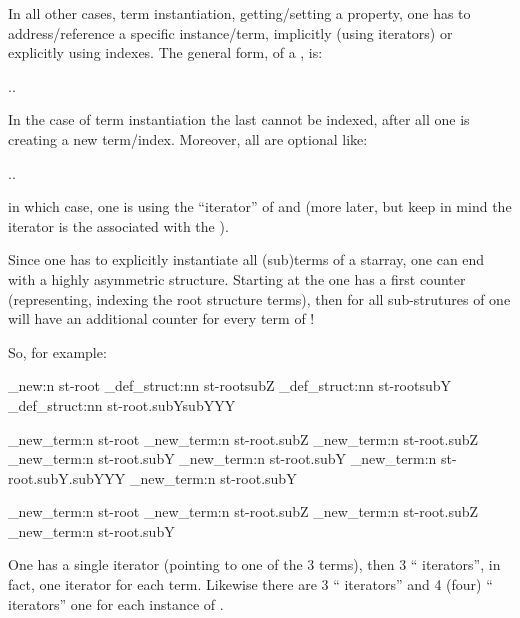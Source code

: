 \documentclass[10pt]{article}
\begin{document}
In all other cases, term instantiation, getting/setting a property, one has to address/reference a specific instance/term, implicitly (using iterators) or explicitly using indexes.
The general form, of a , is: \par
{}.. \par
In the case of term instantiation the last  cannot be indexed, after all one is creating a new term/index. Moreover, all  are optional like:\par
{}.. \par
in which case, one is using the ``iterator'' of  and  (more later, but keep in mind the  iterator is the  associated with the ).

Since one has to explicitly instantiate all (sub)terms of a starray, one can end with a highly asymmetric structure. Starting at the  one has a first counter (representing, indexing the root structure terms), then for all sub-strutures of  one will have an additional counter for every term of  !

So, for example:
\begin{codestore}[store-env=demo4]
\starray_new:n {st-root}
\starray_def_struct:nn {st-root}{subZ}
\starray_def_struct:nn {st-root}{subY}
\starray_def_struct:nn {st-root.subY}{subYYY}

\starray_new_term:n {st-root}
\starray_new_term:n {st-root.subZ}
\starray_new_term:n {st-root.subZ}
\starray_new_term:n {st-root.subY}
\starray_new_term:n {st-root.subY}
\starray_new_term:n {st-root.subY.subYYY}
\starray_new_term:n {st-root.subY}

\starray_new_term:n {st-root}
\starray_new_term:n {st-root.subZ}
\starray_new_term:n {st-root.subZ}
\starray_new_term:n {st-root.subY}
\end{codestore}


One has a single  iterator (pointing to one of the 3  terms), then 3 `` iterators'', in fact, one  iterator for each  term.
Likewise there are 3 `` iterators'' and 4 (four) `` iterators'' one for each instance of .
\end{document}
